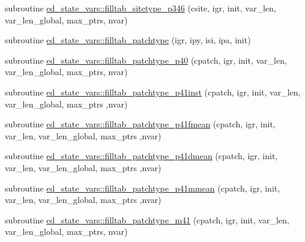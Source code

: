 \begin{DoxyCompactItemize}
\item 
subroutine \hyperlink{namespaceed__state__vars_ad66c156887d39c17d4cb4b0895e5fe24}{ed\+\_\+state\+\_\+vars\+::filltab\+\_\+sitetype\+\_\+p346} (csite, igr, init, var\+\_\+len, var\+\_\+len\+\_\+global, max\+\_\+ptrs, nvar)
\item 
subroutine \hyperlink{namespaceed__state__vars_ac37a860383b752e5263aa945c99824a9}{ed\+\_\+state\+\_\+vars\+::filltab\+\_\+patchtype} (igr, ipy, isi, ipa, init)
\item 
subroutine \hyperlink{namespaceed__state__vars_a83c0921d462c47a37c8d6f97dbdb9d72}{ed\+\_\+state\+\_\+vars\+::filltab\+\_\+patchtype\+\_\+p40} (cpatch, igr, init, var\+\_\+len, var\+\_\+len\+\_\+global, max\+\_\+ptrs, nvar)
\item 
subroutine \hyperlink{namespaceed__state__vars_aaabc9ebf2bd84a36b30887405edca948}{ed\+\_\+state\+\_\+vars\+::filltab\+\_\+patchtype\+\_\+p41inst} (cpatch, igr, init, var\+\_\+len, var\+\_\+len\+\_\+global, max\+\_\+ptrs                                                                                                                                                                   ,nvar)
\item 
subroutine \hyperlink{namespaceed__state__vars_a308bf007a232ca65383f36dd6fbd0084}{ed\+\_\+state\+\_\+vars\+::filltab\+\_\+patchtype\+\_\+p41fmean} (cpatch, igr, init, var\+\_\+len, var\+\_\+len\+\_\+global, max\+\_\+ptrs                                                                                                                                                                   ,nvar)
\item 
subroutine \hyperlink{namespaceed__state__vars_a951f992e438684b78a72bd758f70730e}{ed\+\_\+state\+\_\+vars\+::filltab\+\_\+patchtype\+\_\+p41dmean} (cpatch, igr, init, var\+\_\+len, var\+\_\+len\+\_\+global, max\+\_\+ptrs                                                                                                                                                                   ,nvar)
\item 
subroutine \hyperlink{namespaceed__state__vars_aac151ba29df61cb8a458cb9601ba74a3}{ed\+\_\+state\+\_\+vars\+::filltab\+\_\+patchtype\+\_\+p41mmean} (cpatch, igr, init, var\+\_\+len, var\+\_\+len\+\_\+global, max\+\_\+ptrs                                                                                                                                                                   ,nvar)
\item 
subroutine \hyperlink{namespaceed__state__vars_a326b7df2068b9faa5fc1ea535c86efe2}{ed\+\_\+state\+\_\+vars\+::filltab\+\_\+patchtype\+\_\+m41} (cpatch, igr, init, var\+\_\+len, var\+\_\+len\+\_\+global, max\+\_\+ptrs, nvar)

\end{DoxyCompactItemize}
